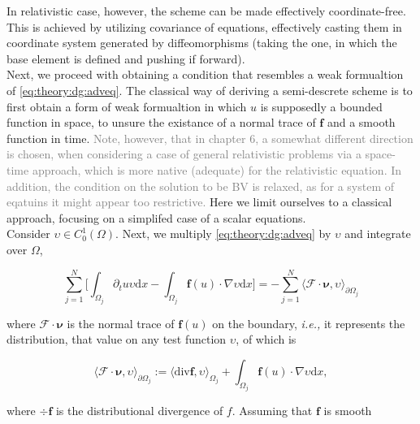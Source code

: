\documentclass[11pt,a4paper,headinclude=true,DIV=14,BCOR=8mm,chapterprefix,listof=totoc,twoside,openright,abstracton]{scrbook}
\begin{document}
In relativistic case, however, the scheme can be made effectively coordinate-free. This is achieved by utilizing covariance of equations, effectively casting them in coordinate system generated by diffeomorphisms (taking the one, in which the base element is defined and pushing if forward). \\


Next, we proceed with obtaining a condition that resembles a weak formualtion of \ref{eq:theory:dg:adveq}. The classical way of deriving a semi-descrete scheme is to first obtain a form of weak formualtion in which $u$ is supposedly a bounded function in space, to unsure the existance of a normal trace of $\boldsymbol{f}$ and a smooth function in time. \textcolor{gray}{Note, however, that in chapter 6, a somewhat different direction is chosen, when considering a case of general relativistic problems via a space-time approach, which is more native (adequate) for the relativistic equation. In addition, the condition on the solution to be BV is relaxed, as for a system of eqatuins it might appear too restrictive.} Here we limit ourselves to a classical approach, focusing on a simplifed case of a scalar equations. \\

Consider $\upsilon \in C_0 ^1(\Omega)$. Next, we multiply \ref{eq:theory:dg:adveq} by $\upsilon$ and integrate over $\Omega$, 

\begin{equation}
    \sum_{j=1}^{N}\Bigg[\int_{\Omega_j}\partial_{t}u\upsilon\text{d}x - \int_{\Omega_j}\boldsymbol{f}(u)\cdot\nabla\upsilon\text{d}x\Bigg] = -\sum_{j=1}^{N}\langle\boldsymbol{\mathcal{F}}\cdot\boldsymbol{\nu},\upsilon\rangle_{\partial\Omega_j}
    \label{eq:theory:dg:intformadveq}
\end{equation}

where $\boldsymbol{\mathcal{F}}\cdot\boldsymbol{\nu}$ is the normal trace of $\boldsymbol{f}(u)$ on the boundary, \textit{i.e.,} it represents the distribution, that value on any test function $\upsilon$, of which is 

\begin{equation}
    \langle\boldsymbol{\mathcal{F}}\cdot\boldsymbol{\nu},\upsilon\rangle_{\partial\Omega_j} := \langle\text{div}\boldsymbol{f},\upsilon\rangle_{\Omega_j} + \int_{\Omega_j}\boldsymbol{f}(u)\cdot\nabla\upsilon\text{d}x,
\end{equation} 

where $\div\boldsymbol{f}$ is the distributional divergence of $f$. Assuming that $\boldsymbol{f}$ is smooth 
\end{document}
